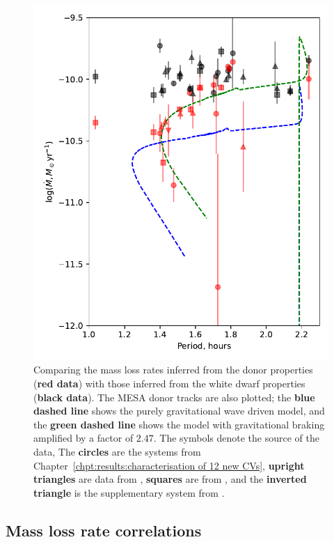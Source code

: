 \begin{figure}
    \centering
    \includegraphics[width=\textwidth]{figures/results/Mdot/compare_mdot_from_donor_vs_wd_vs_period.pdf}
    \caption{Comparing the mass loss rates inferred from the donor properties ({\bf red data}) with those inferred from the white dwarf properties ({\bf black data}). The MESA donor tracks are also plotted; the {\bf blue dashed line} shows the purely gravitational wave driven model, and the {\bf green dashed line} shows the model with gravitational braking amplified by a factor of $2.47$. The symbols denote the source of the data, The {\bf circles} are the systems from Chapter~\ref{chpt:results:characterisation of 12 new CVs}, {\bf upright triangles} are data from \citet{McAllister2019}, {\bf squares} are from \citet{Savoury2011}, and the {\bf inverted triangle} is the supplementary system from \citet{mcallister2017b}.}
    \label{fig:massloss and AML:compare Mdot from donor and WD}
\end{figure}

\newpage
\subsection{Mass loss rate correlations}
\label{sect:massloss and AML:mass loss rate correlations}

